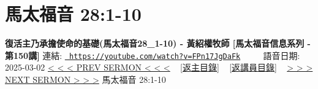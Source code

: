 \documentclass{book}
\begin{document}
\section{馬太福音 28:1-10}
\label{sec:FPn17JgDaFk}
\textbf{復活主乃承擔使命的基礎(馬太福音28\_1-10) - 黃紹權牧師  [馬太福音信息系列 - 第150講]}
\newline
\newline
連結: \href{https://youtube.com/watch?v=FPn17JgDaFk}{\texttt{ https://youtube.com/watch?v=FPn17JgDaFk}} ~~~~ 語音日期: 2025-03-02 
\newline
\newline
\hyperref[sec:XsHcQyRDgsU]{< < < PREV SERMON < < <}
~
\hyperlink{toc}{[返主目錄]}
~
\hyperref[ch:preacher15]{[返講員目錄]}
~
\hyperref[sec:zNZ0_TjZo3U]{> > > NEXT SERMON > > >}
\newline
\newline
馬太福音 28:1-10
\newline
\end{document}
